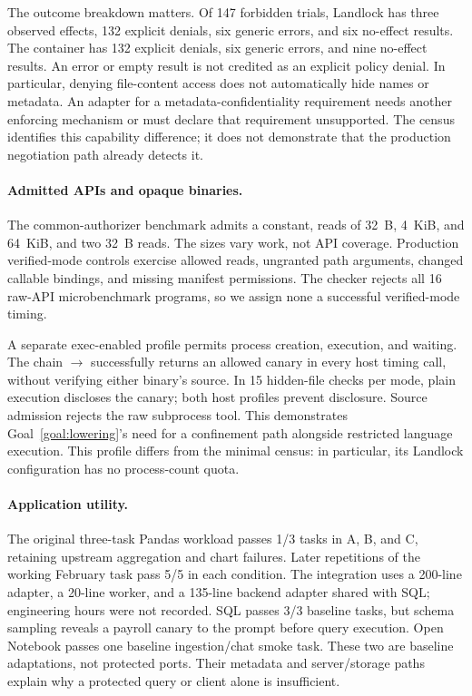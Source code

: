The outcome breakdown matters. Of 147 forbidden trials, Landlock has three
observed effects, 132 explicit denials, six generic errors, and six no-effect
results. The container has 132 explicit denials, six generic errors, and nine
no-effect results. An error or empty result is not credited as an explicit
policy denial. In particular, denying file-content access does not automatically
hide names or metadata. An adapter for a metadata-confidentiality requirement
needs another enforcing mechanism or must declare that requirement unsupported.
The census identifies this capability difference; it does not demonstrate that
the production negotiation path already detects it.

\paragraph{Admitted APIs and opaque binaries.}
The common-authorizer benchmark admits a constant, reads of 32~B, 4~KiB, and
64~KiB, and two 32~B reads. The sizes vary work, not API coverage. Production
verified-mode controls exercise allowed reads, ungranted path arguments,
changed callable bindings, and missing manifest permissions. The checker rejects
all 16 raw-API microbenchmark programs, so we assign none a successful
verified-mode timing.

A separate exec-enabled profile permits process creation, execution, and waiting.
The chain  $\rightarrow$  successfully returns
an allowed canary in every host timing call, without verifying either binary's
source. In 15 hidden-file checks per mode, plain execution discloses the canary;
both host profiles prevent disclosure. Source admission rejects the raw
subprocess tool. This demonstrates Goal~\ref{goal:lowering}'s need for a
confinement path alongside restricted language execution. This profile differs from the minimal
census: in particular, its Landlock configuration has no process-count quota.

\paragraph{Application utility.}
The original three-task Pandas workload passes 1/3 tasks in A, B, and C,
retaining upstream aggregation and chart failures. Later repetitions of the
working February task pass 5/5 in each condition. The integration uses a 200-line
adapter, a 20-line worker, and a 135-line backend adapter shared with SQL;
engineering hours were not recorded. SQL passes 3/3 baseline tasks, but schema
sampling reveals a payroll canary to the prompt before query execution.
Open Notebook passes one baseline ingestion/chat smoke task. These two are
baseline adaptations, not protected ports. Their metadata and server/storage
paths explain why a protected query or client alone is insufficient.


